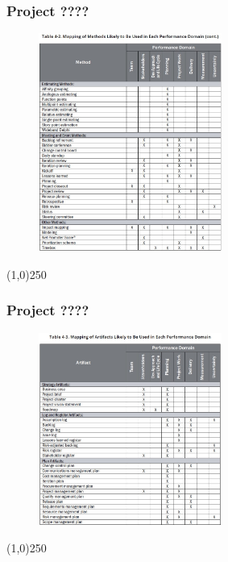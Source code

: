 \begin{frame}
\frametitle{Project ????}
 \begin{figure}
    \centering
        \includegraphics[width = 6cm]{../images/guide/Table4-2b.jpg}
    \label{guideTable:4-2b}
 \end{figure}
\end{frame}
\begin{center}\line(1,0){250}\end{center}


\begin{frame}
\frametitle{Project ????}
 \begin{figure}
    \centering
        \includegraphics[width = 6cm]{../images/guide/Table4-3a.jpg}
    \label{guideTable:4-3a}
 \end{figure}
\end{frame}
\begin{center}\line(1,0){250}\end{center}


